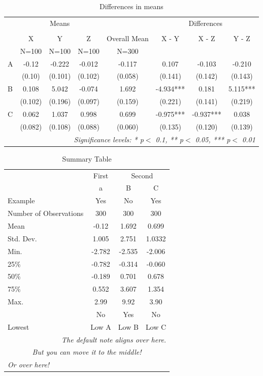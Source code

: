 \begin{table}[!htbp]
  \centering
  \caption{Differences in means}
  \label{table:differencesinmeans}
\begin{tabular}{lccccccc}
  \toprule
  \toprule
   & \multicolumn{3}{c}{Means} & \multicolumn{1}{c}{} & \multicolumn{3}{c}{Differences} \\
  \cline{2-4}\cline{6-8}\\

   & X & Y & Z & Overall Mean & X - Y & X - Z & Y - Z\\
   & N=100 & N=100 & N=100 & N=300 &  &  & \\
  \midrule
  A & -0.12 & -0.222 & -0.012 & -0.117 & 0.107 & -0.103 & -0.210 \\
   & (0.10) & (0.101) & (0.102) & (0.058) & (0.141) & (0.142) & (0.143) \\
  B & 0.108 & 5.042 & -0.074 & 1.692 & -4.934*** & 0.181 & 5.115*** \\
   & (0.102) & (0.196) & (0.097) & (0.159) & (0.221) & (0.141) & (0.219) \\
  C & 0.062 & 1.037 & 0.998 & 0.699 & -0.975*** & -0.937*** & 0.038 \\
   & (0.082) & (0.108) & (0.088) & (0.060) & (0.135) & (0.120) & (0.139) \\
  \bottomrule
  \multicolumn{8}{r}{{\small \textit{Significance levels: * p$<$ 0.1, ** p$<$ 0.05, *** p$<$ 0.01}}}\\
\end{tabular}
\end{table}
\begin{table}[!htbp]
  \centering
\begin{tabular}{lccc}
  \toprule
  \toprule
   & \multicolumn{1}{c}{First} & \multicolumn{2}{c}{Second} \\
   & a & B & C\\
  Example & Yes & No & Yes\\
  \midrule
  Number of Observations & 300 & 300 & 300 \\
  Mean & -0.12 & 1.692 & 0.699 \\
  Std. Dev. & 1.005 & 2.751 & 1.0332 \\
  Min. & -2.782 & -2.535 & -2.006 \\
  25\% & -0.782 & -0.314 & -0.060 \\
  50\% & -0.189 & 0.701 & 0.678 \\
  75\% & 0.552 & 3.607 & 1.354 \\
  Max. & 2.99 & 9.92 & 3.90 \\
   & No & Yes & No\\
  \bottomrule
  Lowest & Low A & Low B & Low C\\
  \bottomrule
  \multicolumn{4}{r}{{\small \textit{The default note aligns over here.}}}\\
  \multicolumn{4}{c}{{\small \textit{But you can move it to the middle!}}}\\
  \multicolumn{4}{l}{{\small \textit{Or over here!}}}\\
\end{tabular}
  \caption{Summary Table}
  \label{table:summarytable}
\end{table}
